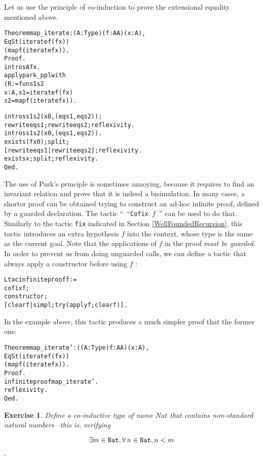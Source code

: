 \documentclass[11pt]{article}
\newcommand{\refmancite}[1]{{}}
\newtheorem{exercise}{Exercise}[section]
\begin{document}
Let us use the principle of co-induction to prove the extensional
equality mentioned above.
\begin{alltt}
Theorem map_iterate : {\prodsym} (A:Type)(f:A{\arrow}A)(x:A),
                       EqSt (iterate f (f x))
                            (map f (iterate f x)).
Proof.
 intros A f x.
 apply park_ppl with
   (R:= fun s1 s2 {\funarrow}
       {\exsym} x: A, s1 = iterate f (f x) {\coqand}
                s2 = map f (iterate f x)).

 intros s1 s2 (x0,(eqs1,eqs2));
    rewrite eqs1; rewrite eqs2; reflexivity.
 intros s1 s2 (x0,(eqs1,eqs2)).
 exists (f x0);split;
    [rewrite eqs1|rewrite eqs2]; reflexivity.
 exists x;split; reflexivity.
Qed.
\end{alltt}

The use of Park's principle is sometimes annoying, because it requires
to find an invariant relation and prove that it is indeed a
bisimulation.  In many cases, a shorter proof can be obtained trying
to construct an ad-hoc infinite proof, defined by a guarded
declaration.  The tactic ``~``\texttt{Cofix $f$}~'' can be used to do
that. Similarly to the tactic \texttt{fix} indicated in Section
\ref{WellFoundedRecursion}, this tactic introduces an extra hypothesis
$f$ into the context, whose type is the same as the current goal. Note
that the applications of $f$ in the proof \textsl{must be guarded}. In
order to prevent us from doing unguarded calls, we can define a tactic
that always apply a constructor before using $f$ \refmancite{Chapter
\ref{WritingTactics}} :

\begin{alltt}
Ltac infiniteproof f :=
  cofix f;
  constructor;
  [clear f| simpl; try (apply f; clear f)].
\end{alltt}


In the example above, this tactic produces a much simpler proof
that the former one:

\begin{alltt}
Theorem map_iterate' : {\prodsym} ((A:Type)f:A{\arrow}A)(x:A),
                       EqSt (iterate f (f x))
                            (map f (iterate f x)).
Proof.
 infiniteproof map_iterate'.
 reflexivity.
Qed.
\end{alltt}

\begin{exercise}
Define a co-inductive type of name $Nat$ that contains non-standard
natural numbers --this is, verifying

$$\exists m  \in \mbox{\texttt{Nat}}, \forall\, n \in \mbox{\texttt{Nat}}, n<m$$.
\end{exercise}
\end{document}
